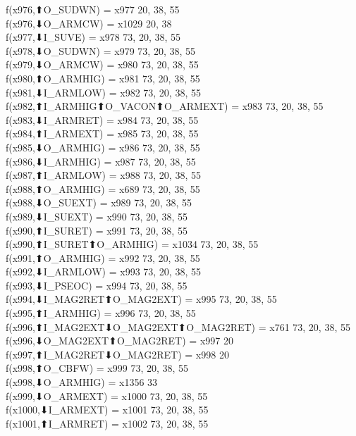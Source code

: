 f(x976,⬆O_SUDWN) = x977 {20, 38, 55} \\
f(x976,⬇O_ARMCW) = x1029 {20, 38} \\
f(x977,⬇I_SUVE) = x978 {73, 20, 38, 55} \\
f(x978,⬇O_SUDWN) = x979 {73, 20, 38, 55} \\
f(x979,⬇O_ARMCW) = x980 {73, 20, 38, 55} \\
f(x980,⬆O_ARMHIG) = x981 {73, 20, 38, 55} \\
f(x981,⬇I_ARMLOW) = x982 {73, 20, 38, 55} \\
f(x982,⬆I_ARMHIG⬆O_VACON⬆O_ARMEXT) = x983 {73, 20, 38, 55} \\
f(x983,⬇I_ARMRET) = x984 {73, 20, 38, 55} \\
f(x984,⬆I_ARMEXT) = x985 {73, 20, 38, 55} \\
f(x985,⬇O_ARMHIG) = x986 {73, 20, 38, 55} \\
f(x986,⬇I_ARMHIG) = x987 {73, 20, 38, 55} \\
f(x987,⬆I_ARMLOW) = x988 {73, 20, 38, 55} \\
f(x988,⬆O_ARMHIG) = x689 {73, 20, 38, 55} \\
f(x988,⬇O_SUEXT) = x989 {73, 20, 38, 55} \\
f(x989,⬇I_SUEXT) = x990 {73, 20, 38, 55} \\
f(x990,⬆I_SURET) = x991 {73, 20, 38, 55} \\
f(x990,⬆I_SURET⬆O_ARMHIG) = x1034 {73, 20, 38, 55} \\
f(x991,⬆O_ARMHIG) = x992 {73, 20, 38, 55} \\
f(x992,⬇I_ARMLOW) = x993 {73, 20, 38, 55} \\
f(x993,⬇I_PSEOC) = x994 {73, 20, 38, 55} \\
f(x994,⬇I_MAG2RET⬆O_MAG2EXT) = x995 {73, 20, 38, 55} \\
f(x995,⬆I_ARMHIG) = x996 {73, 20, 38, 55} \\
f(x996,⬆I_MAG2EXT⬇O_MAG2EXT⬆O_MAG2RET) = x761 {73, 20, 38, 55} \\
f(x996,⬇O_MAG2EXT⬆O_MAG2RET) = x997 {20} \\
f(x997,⬆I_MAG2RET⬇O_MAG2RET) = x998 {20} \\
f(x998,⬆O_CBFW) = x999 {73, 20, 38, 55} \\
f(x998,⬇O_ARMHIG) = x1356 {33} \\
f(x999,⬇O_ARMEXT) = x1000 {73, 20, 38, 55} \\
f(x1000,⬇I_ARMEXT) = x1001 {73, 20, 38, 55} \\
f(x1001,⬆I_ARMRET) = x1002 {73, 20, 38, 55} \\
